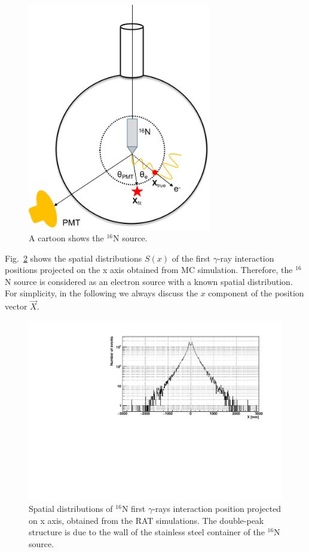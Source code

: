 \begin{figure}[!htb]
	\centering
	\includegraphics[width=8cm]{N16centralDiagram.png}
	\caption{A cartoon shows the $^{16}$N source.}
	\label{N16centralDiagram}
\end{figure}

Fig.~\ref{hsx} shows the spatial distributions $S(x)$ of the first $\gamma$-ray interaction positions projected on the x axis obtained from MC simulation. Therefore, the $^{16}$N source is considered as an electron source with a known spatial distribution\cite{boulay2004direct}. For simplicity, in the following we always discuss the $x$ component of the position vector $\vec{X}$. 

\begin{figure}[!htb]
	\centering
	\includegraphics[width=12cm]{sx.pdf}
	\caption{Spatial distributions of {$^{16}$}N first $\gamma$-rays interaction position projected on x axis, obtained from the RAT simulations. The double-peak structure is due to the wall of the stainless steel container of the $^{16}$N source.}
	\label{hsx}
\end{figure}

